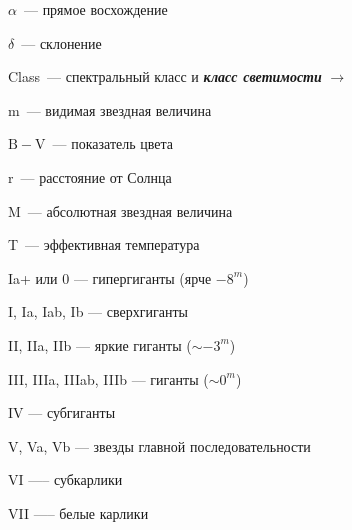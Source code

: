 \documentclass[a4paper,14pt]{article}
\newenvironment{itemize*}%
{\vspace{0.1cm}
	\begin{itemize}%
		\setlength{\itemsep}{1pt}%
		\setlength{\parskip}{1pt}}%
	{\end{itemize}
	\vspace{-0.1cm}
}
\begin{document}
\begin{landscape}
\noindent
\begin{minipage}[l]{0.52\linewidth}
\begin{itemize*}
	\item $\alpha$~--- прямое восхождение
	\item $\delta$~--- склонение
	\item Class~--- спектральный класс и \emph{\textbf{класс светимости}} $\longrightarrow$
	\item m~--- видимая звездная величина
	\item $\mathrm{B-V}$~--- показатель цвета
	\item r~--- расстояние от Солнца
	\item M~--- абсолютная звездная величина
	\item T~--- эффективная температура
\end{itemize*}
\end{minipage}
\hfill
\begin{minipage}[l]{0.45\linewidth}
\begin{itemize*}
\renewcommand{\labelitemi}{$\star$}
		\item Ia+ или 0 --- гипергиганты (ярче $-8^m$)
		\item I, Ia, Iab, Ib --- сверхгиганты
		\item II, IIa, IIb — яркие гиганты ($\sim -3^m$)
		\item III, IIIa, IIIab, IIIb --- гиганты ($\sim 0^m$)
		\item IV --- субгиганты
		\item V, Va, Vb --- звезды главной последовательности
		\item VI —-- субкарлики
		\item VII —-- белые карлики
\end{itemize*}
\end{minipage}

\end{landscape}
\end{document}
